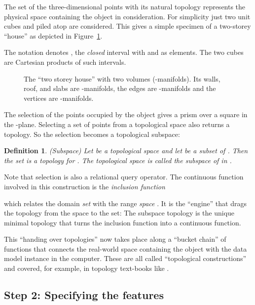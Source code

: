 \documentclass[5p]{elsarticle}
\newtheorem{dfn}{Definition}
\newcommand{\qq}[1]{``#1''}
\begin{document}
The set  of the three-dimensional points with its natural topology represents the 
physical space containing the object in consideration. 
For simplicity just two unit cubes  and  piled atop are considered. 
This gives a simple specimen of a two-storey \qq{house} as depicted in Figure~\ref{fig:house}. 

The notation  denotes , the \emph{closed} interval
with  and  as elements. The two cubes are Cartesian products of such intervals. 

\begin{figure}[b]

\caption{The \qq{two storey house} with two volumes (-manifolds). Its walls, roof, and slabs 
are -manifolds, the edges are -manifolds and the vertices are -manifolds.} 
\label{fig:house}
\end{figure}

The selection  of the points occupied by the object gives   
 a prism over a square in the 
-plane. Selecting a set of points from a topological space also returns a 
topology. So the selection becomes a topological subspace: 
\begin{dfn}(Subspace)
Let  be a topological space and let  be a subset of . 
Then the set 
 is a topology for . 
The topological space  is called the \emph{subspace} of  
in . 
\end{dfn}
Note that selection is also a relational query operator. 
The continuous function involved in this construction is 
the \emph{inclusion function} 

which relates the domain \emph{set}  with the range \emph{space} 
. 
It is the \qq{engine} that drags the topology from the space to the set: 
The subspace topology is the unique minimal topology that turns the inclusion 
function  into a continuous function. 

\begin{sloppy} This \qq{handing over topologies} now takes place along a \qq{bucket chain} of functions that connects 
the real-world space  containing the object with the data model instance in the 
computer. These are all called \qq{topological constructions} and covered, for example, in topology 
text-books like \cite[Ch.\ IV]{Viro:Textbook}. 
\end{sloppy} 

\subsection{Step 2: Specifying the features}
\end{document}
